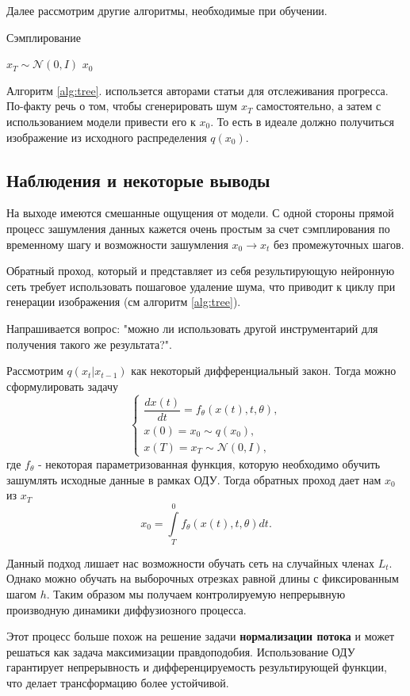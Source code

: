 \documentclass[11pt, a4paper, twocolumn, twoside]{article} %
\begin{document}
Далее рассмотрим другие алгоритмы, необходимые при обучении.
\begin{algorithm}
\caption{Сэмплирование}\label{alg:tree}
$x_T\sim\mathcal{N}(0, I)$\;
\Return $x_0$
\end{algorithm}
Алгоритм \ref{alg:tree}. использется авторами статьи \cite{Ho2020} для отслеживания прогресса. По-факту речь о том, чтобы сгенерировать шум $x_T$ самостоятельно, а затем с использованием модели привести его к $x_0$. То есть в идеале должно получиться изображение из исходного распределения $q(x_0)$. 

\subsection{Наблюдения и некоторые выводы}

На выходе имеются смешанные ощущения от модели. С одной стороны прямой процесс зашумления данных кажется очень простым за счет сэмплирования по временному шагу и возможности зашумления $x_0\to x_t$ без промежуточных шагов. 

Обратный проход, который и представляет из себя результирующую нейронную сеть требует использовать пошаговое удаление шума, что приводит к циклу при генерации изображения (см алгоритм \ref{alg:tree}).

Напрашивается вопрос: "можно ли использовать другой инструментарий для получения такого же результата?". 

Рассмотрим $q(x_t|x_{t-1})$ как некоторый дифференциальный закон. Тогда можно сформулировать задачу
\begin{equation}
    \begin{cases}
        \dfrac{dx(t)}{dt} = f_\theta(x(t), t, \theta), \\x(0) = x_0\sim q(x_0), \\x(T) = x_T\sim \mathcal{N}(0, I),
    \end{cases}
\end{equation}
где $f_\theta$ - некоторая параметризованная функция, которую необходимо обучить зашумлять исходные данные в рамках ОДУ. Тогда обратных проход дает нам $x_0$ из $x_T$
\begin{equation}
    x_0 = \int\limits_T^0 f_\theta(x(t), t, \theta)dt.
\end{equation}

Данный подход лишает нас возможности обучать сеть на случайных членах $L_t$. Однако можно обучать на выборочных отрезках равной длины с фиксированным шагом $h$. Таким образом мы получаем контролируемую непрерывную производную динамики диффузиозного процесса.

Этот процесс больше похож на решение задачи \textbf{нормализации потока} и может решаться как задача максимизации правдоподобия. Использование ОДУ гарантирует непрерывность и дифференцируемость результирующей функции, что делает трансформацию более устойчивой. 

\newpage


\end{document}

